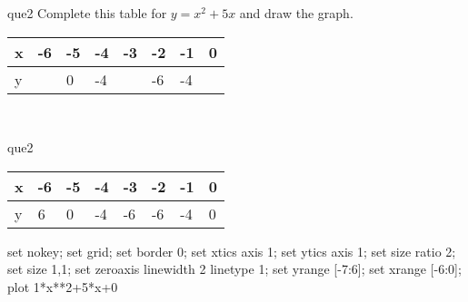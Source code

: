 \documentclass[13.5pt, varwidth=true]{beamer}
\begin{document}
\begin{frame}[shrink=19,fragile]
	\begin{beamercolorbox}[rounded=true, left, shadow=true,wd=14.8cm]{que2}
		 Complete this table for $y = x^{2} + 5x$ and draw the graph. \\[0.3cm] \renewcommand{\arraystretch}{1.2}\begin{tabular}{|C|C|C|C|C|C|C|C|} \hline x & -6 & -5 & -4 & -3 & -2 & -1 & 0 \\ \hline y &  & 0 & -4 &  & -6 & -4 & \\ \hline \end{tabular}\\[0.3cm]
	\end{beamercolorbox}
\end{frame}
\begin{frame}[shrink=19,fragile]
	\begin{beamercolorbox}[rounded=true, left, shadow=true,wd=14.8cm]{que2}
		\renewcommand{\arraystretch}{1.2}\begin{tabular}{|C|C|C|C|C|C|C|C|} \hline x & -6 & -5 & -4 & -3 & -2 & -1 & 0 \\ \hline y & 6 & 0 & -4 & -6 & -6 & -4 & 0\\ \hline \end{tabular}\begin{gnuplot}[terminal=pdf] set nokey; set grid; set border 0; set xtics axis 1; set ytics axis 1; set size ratio 2; set size 1,1; set zeroaxis linewidth 2 linetype 1; set yrange [-7:6]; set xrange [-6:0]; plot 1*x**2+5*x+0 \end{gnuplot}
	\end{beamercolorbox}
\end{frame}
\end{document}
